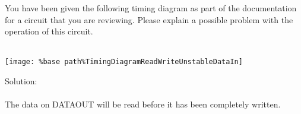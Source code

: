 You have been given the following timing diagram as part of the documentation for a circuit that you are reviewing.  Please explain a possible problem with the operation of this circuit.\\ \\
\begin{center}
  \texttt{[image: \%base path\%TimingDiagramReadWriteUnstableDataIn]}
\end{center}

Solution: \\ \\
The data on DATAOUT will be read before it has been completely written.
